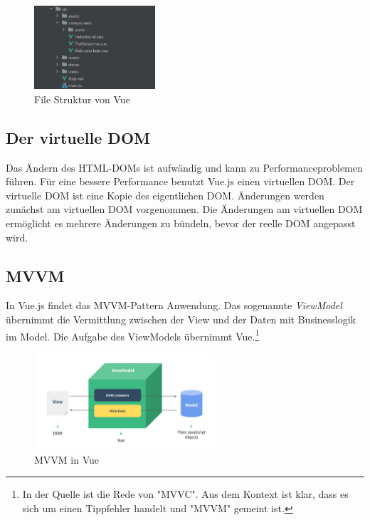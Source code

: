 \begin{figure}[H]
  \centering
  \includegraphics[width=0.4\textwidth]{img/vueFileStructure}
  \caption{File Struktur von Vue}
  \label{fig:vueFileStructure}
\end{figure}

\subsection*{Der virtuelle DOM}
Das Ändern des HTML-DOMs ist aufwändig und kann zu Performanceproblemen führen.
Für eine bessere Performance benutzt Vue.js einen virtuellen DOM.
Der virtuelle DOM ist eine Kopie des eigentlichen DOM.
Änderungen werden zunächst am virtuellen DOM vorgenommen.
Die Änderungen am virtuellen DOM ermöglicht es mehrere Änderungen zu bündeln,
bevor der reelle DOM angepasst wird. \cite[S. 10-11]{steyer2019} %

\subsection*{MVVM}
In Vue.js findet das MVVM-Pattern Anwendung.
Das sogenannte \emph{ViewModel} übernimmt die Vermittlung zwischen der View
und der Daten mit Businesslogik im Model.
Die Aufgabe des ViewModels übernimmt Vue.\cite[S. 43]{steyer2019}\footnote{In der Quelle ist die Rede von "MVVC". Aus dem Kontext ist klar, dass es sich um einen Tippfehler handelt und "MVVM" gemeint ist.}

\begin{figure}[H]
  \centering
  \includegraphics[width=0.6\textwidth]{img/mvvm}
  \caption{MVVM in Vue \cite{gettingStarted012}}
  \label{fig:mvvm}
\end{figure}

